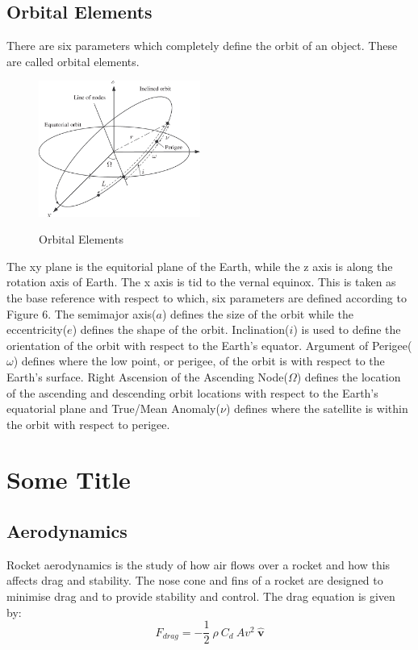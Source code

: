 \documentclass[12pt, letterpaper]{article}
\begin{document}
\subsection{Orbital Elements}
There are six parameters which completely define the orbit of an object. These are called orbital elements.

\begin{figure}[ht]
	\centering
    \includegraphics[width = 200px]{orbital_elements}
    \label{fig:elements}
    \caption{Orbital Elements}
\end{figure}
The xy plane is the equitorial plane of the Earth, while the z axis is along the rotation axis of Earth. The x axis is tid to the vernal equinox. This is taken as the base reference with respect to which, six parameters are defined according to Figure 6. The semimajor axis($a$) defines the size of the orbit while the eccentricity($e$) defines the shape of the orbit. Inclination($i$) is used to define the orientation of the orbit with respect to the Earth's equator. Argument of Perigee($\omega$) defines where the low point, or perigee, of the orbit is with respect to the Earth's surface. Right Ascension of the Ascending Node($\Omega$) defines the location of the ascending and descending orbit locations with respect to the Earth's equatorial plane and True/Mean Anomaly($\nu$) defines where the satellite is within the orbit with respect to perigee.

\newpage
\section{Some Title}
\subsection{Aerodynamics}
Rocket aerodynamics is the study of how air flows over a rocket and how this affects drag and stability. The nose cone and fins of a rocket are designed to minimise drag and to provide stability and control. The drag equation is given by:
\[
	F_{drag} = -\frac{1}{2}\: \rho \: C_d \: A v^2 \: \hat{\mathbf{v}}
\]
\end{document}
